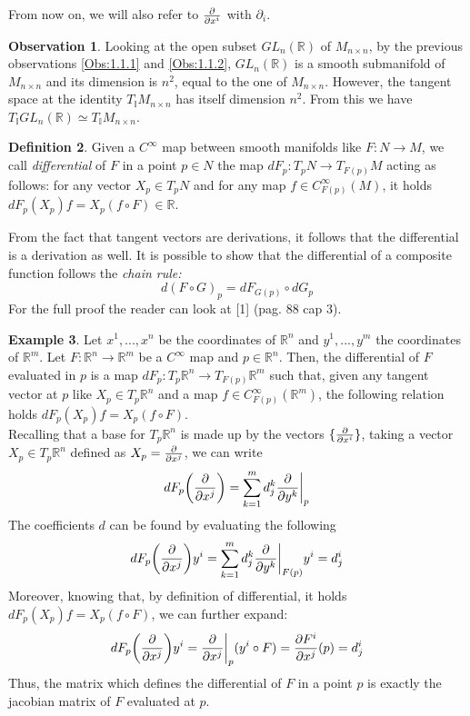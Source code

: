 \documentclass[12pt,a4paper]{report}
\theoremstyle{definition}
\newtheorem{Def}{Definition}[chapter]
\theoremstyle{Theorem}
\theoremstyle{definition}
\newtheorem{Ex}[Def]{Example}
\theoremstyle{definition}
\newtheorem{Obs}[Def]{Observation}
\begin{document}
	From now on, we will also refer to $\partial\over \partial x^i$ with $\partial_i$.
	\begin{Obs} \label{Obs 1.1.3}
		Looking at the open subset $GL_n(\mathbb{R})$ of $M_{n\times n}$, by the previous observations \ref{Obs:1.1.1} and \ref{Obs:1.1.2}, $GL_n(\mathbb{R})$ is a smooth submanifold of $M_{n\times n}$ and its dimension is $n^2$, equal to the one of $M_{n\times n}$. However, the tangent space at the identity $T_\mathbb{I}M_{n\times n}$ has itself dimension $n^2$. From this we have $T_\mathbb{I}GL_n(\mathbb{R})\simeq T_\mathbb{I}M_{n\times n}$.
	\end{Obs}
	\begin{Def}
		Given a $C^\infty$ map between smooth manifolds like $F:N\rightarrow M$, we call \textit{differential} of $F$ in a point $p\in N$ the map $dF_p:T_pN\rightarrow T_{F(p)}M$ acting as follows: for any vector $X_p\in T_pN$ and for any map $f\in C_{F(p)}^\infty(M)$, it holds $dF_p(X_p)f=X_p(f\circ F)\in\mathbb{R}$.
	\end{Def}
	From the fact that tangent vectors are derivations, it follows that the differential is a derivation as well. It is possible to show that the differential of a composite function follows the \textit{chain rule:} 
	$$d(F\circ G)_p=dF_{G(p)}\circ dG_p$$ 
	For the full proof the reader can look at [1] (pag. 88 cap 3).
	\begin{Ex}
		Let $x^1,...,x^n$ be the coordinates of $\mathbb{R}^n$ and $y^1,...,y^m$ the coordinates of $\mathbb{R}^m$. Let $F:\mathbb{R}^n\rightarrow \mathbb{R}^m$ be a $C^\infty$ map and $p\in \mathbb{R}^n$. Then, the differential of $F$ evaluated in $p$ is a map $dF_p:T_p\mathbb{R}^n\rightarrow T_{F(p)}\mathbb{R}^m$ such that, given any tangent vector at $p$ like $X_p\in T_p\mathbb{R}^n$ and a map $f\in C_{F(p)}^\infty(\mathbb{R}^m)$, the following relation holds $dF_p(X_p)f=X_p(f\circ F)$.\\
		Recalling that a base for $T_p\mathbb{R}^n$ is made up by the vectors $\{{\partial\over\partial x^i}\}$, taking a vector $X_p\in T_p\mathbb{R}^n$ defined as $X_p={\partial\over \partial x^j}$, we can write $$dF_p\bigg{(}{\partial\over \partial x^j}\bigg{)}=\sum_{k=1}^{m}d_j^k{\partial\over \partial y^k}\bigg{\rvert}_p$$
		The coefficients $d$ can be found by evaluating the following 
		$$dF_p\bigg{(}{\partial\over \partial x^j}\bigg{)}y^i=\sum_{k=1}^{m}d_j^k{\partial\over \partial y^k}\bigg{\rvert}_{F(p)}y^i=d_j^i$$
		Moreover, knowing that, by definition of differential, it holds $dF_p(X_p)f=X_p(f\circ F)$, we can further expand:
		$$dF_p\bigg{(}{\partial\over \partial x^j}\bigg{)}y^i={\partial\over \partial x^j}\bigg{\rvert}_p(y^i\circ F)={\partial F^i\over \partial x^j}(p)=d^i_j$$
		Thus, the matrix which defines the differential of $F$ in a point $p$ is exactly the jacobian matrix of $F$ evaluated at $p$.
	\end{Ex}
\end{document}
